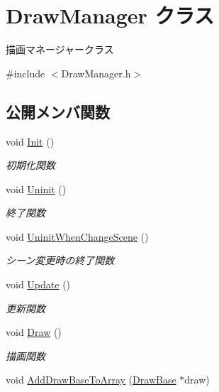\hypertarget{class_draw_manager}{}\section{Draw\+Manager クラス}
\label{class_draw_manager}


描画マネージャークラス  




{\ttfamily \#include $<$Draw\+Manager.\+h$>$}

\subsection*{公開メンバ関数}
\begin{DoxyCompactItemize}
\item 
void \mbox{\hyperlink{class_draw_manager_a3cb9319d492285bd9dfc983d27e5d04f}{Init}} ()
\begin{DoxyCompactList}\small\item\em 初期化関数 \end{DoxyCompactList}\item 
void \mbox{\hyperlink{class_draw_manager_ae58095d9d734f30211011e9205aa57aa}{Uninit}} ()
\begin{DoxyCompactList}\small\item\em 終了関数 \end{DoxyCompactList}\item 
void \mbox{\hyperlink{class_draw_manager_a8b4ea38d625efbcc08d9b168cb5465f9}{Uninit\+When\+Change\+Scene}} ()
\begin{DoxyCompactList}\small\item\em シーン変更時の終了関数 \end{DoxyCompactList}\item 
void \mbox{\hyperlink{class_draw_manager_af498c44ff698bf3ef473df970e24c917}{Update}} ()
\begin{DoxyCompactList}\small\item\em 更新関数 \end{DoxyCompactList}\item 
void \mbox{\hyperlink{class_draw_manager_a43372495e68d77a2698f211cf921b37e}{Draw}} ()
\begin{DoxyCompactList}\small\item\em 描画関数 \end{DoxyCompactList}\item 
void \mbox{\hyperlink{class_draw_manager_a9dbd645fdbf927cd43d400335ff9b286}{Add\+Draw\+Base\+To\+Array}} (\mbox{\hyperlink{class_draw_base}{Draw\+Base}} $\ast$draw)

\end{DoxyCompactItemize}
